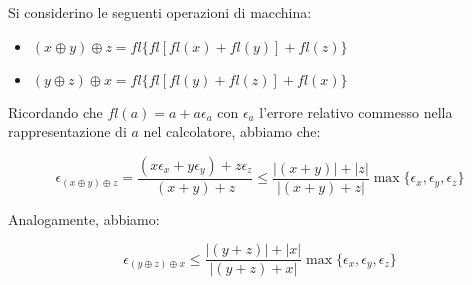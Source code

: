 \begin{center}
\footnotesize\noindent{}\end{center}

Si considerino le seguenti operazioni di macchina:

\begin{itemize}

\item \((x \oplus y) \oplus z = fl\{ fl[ fl(x) + fl(y) ] + fl(z)\}\)
\item \((y \oplus z) \oplus x = fl\{ fl[ fl(y) + fl(z) ] + fl(x)\}\)

\end{itemize}

\noindent Ricordando che \(fl(a) = a + a\epsilon_a\) con \(\epsilon_a\) l'errore relativo commesso nella rappresentazione di \(a\) nel calcolatore, abbiamo che:

\[
\epsilon_{(x \oplus y) \oplus z } = \frac{(x \epsilon_x + y \epsilon_y) + z \epsilon_z}{(x+y)+z} \leq \frac{|(x+y)| + |z|}{|(x+y)+z|} \max\{\epsilon_x, \epsilon_y, \epsilon_z\}
\]

\noindent Analogamente, abbiamo:

\[
\epsilon_{(y \oplus z) \oplus x } \leq \frac{ |(y+z)| + |x| }{|(y+z) + x|}\max\{\epsilon_x, \epsilon_y, \epsilon_z\}
\]

